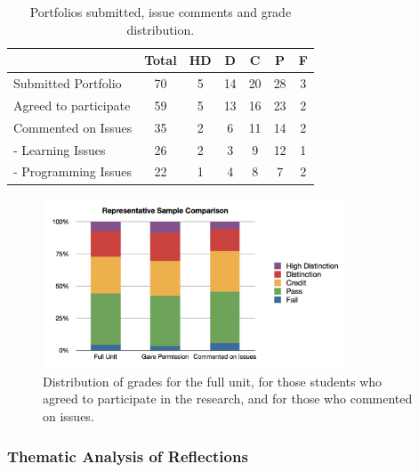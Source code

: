 \begin{table}[p]
	\footnotesize
	\renewcommand{\arraystretch}{1.3}
	\caption{Portfolios submitted, issue comments and grade distribution.}
	\label{tbl:issues_student_numbers}
	\centering
	\begin{tabular}{l|c|c|c|c|c|c}
        ~                     & Total & HD & D & C & P & F  \\ \hline
        Submitted Portfolio   & 70    & 5                & 14          & 20     & 28   & 3     \\ %
        Agreed to participate & 59    & 5                & 13          & 16     & 23   & 2     \\ %
        Commented on Issues   & 35    & 2                & 6           & 11     & 14   & 2     \\ 
         - Learning Issues    & 26    & 2                & 3           & 9     & 12   & 1     \\ 
         - Programming Issues & 22    & 1                & 4           & 8     & 7   & 2     \\
	\end{tabular}
\end{table}

\begin{figure}[thbp]
	\centering
	\includegraphics[width=0.8\textwidth]{IssuesGradeDistributions}
	\caption{Distribution of grades for the full unit, for those students who agreed to participate in the research, and for those who commented on issues.}
	\label{fig:issues_grade_dist}
\end{figure}




\subsubsection{Thematic Analysis of Reflections} %
\label{sub:thematic_analysis_of_reflections}

